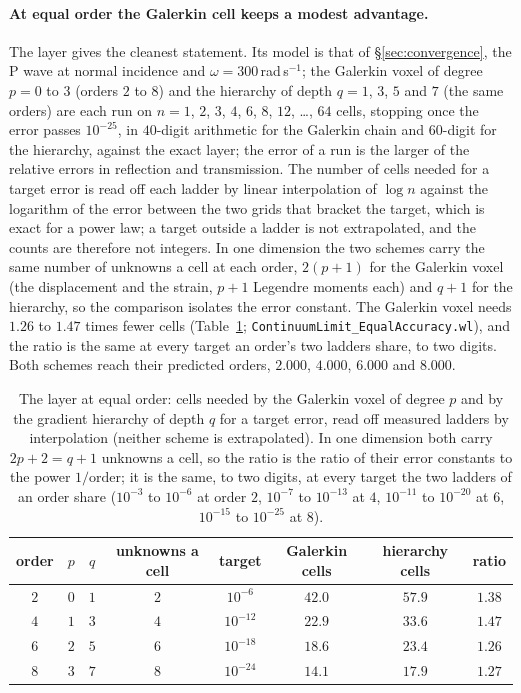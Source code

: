 \documentclass[11pt,a4paper]{article}
\newcommand{\nb}[1]{\texttt{#1}}
\begin{document}
\paragraph{At equal order the Galerkin cell keeps a modest advantage.} The layer gives the cleanest
statement. Its model is that of \S\ref{sec:convergence}, the P wave at normal incidence and
$\omega=300$\,rad\,s$^{-1}$; the Galerkin voxel of degree $p=0$ to $3$ (orders $2$ to $8$) and the
hierarchy of depth $q=1$, $3$, $5$ and $7$ (the same orders) are each run on $n=1$, $2$, $3$, $4$, $6$,
$8$, $12$, \dots, $64$ cells, stopping once the error passes $10^{-25}$, in $40$-digit arithmetic for the
Galerkin chain and $60$-digit for the hierarchy, against the exact layer; the error of a run is the larger
of the relative errors in reflection and transmission. The number of cells needed for a target error is
read off each ladder by linear interpolation of $\log n$ against the logarithm of the error between the
two grids that bracket the target, which is exact for a power law; a target outside a ladder is not
extrapolated, and the counts are therefore not integers. In one dimension the two schemes carry the same
number of unknowns a cell at each order, $2(p+1)$ for the Galerkin voxel (the displacement and the
strain, $p+1$ Legendre moments each) and $q+1$ for the hierarchy, so the comparison isolates the error
constant. The Galerkin voxel needs $1.26$ to $1.47$ times fewer cells (Table~\ref{tab:gainlayer};
\nb{ContinuumLimit\_EqualAccuracy.wl}), and the ratio is the same at every target an order's two
ladders share, to two digits. Both schemes reach their predicted orders, $2.000$, $4.000$, $6.000$ and
$8.000$.
\begin{table}[htbp]
\centering
\caption{The layer at equal order: cells needed by the Galerkin voxel of degree $p$ and by the gradient
hierarchy of depth $q$ for a target error, read off measured ladders by interpolation (neither scheme
is extrapolated). In one dimension both carry $2p+2=q+1$ unknowns a cell, so the ratio is the ratio of
their error constants to the power $1/\text{order}$; it is the same, to two digits, at every target the
two ladders of an order share ($10^{-3}$ to $10^{-6}$ at order $2$, $10^{-7}$ to $10^{-13}$ at $4$,
$10^{-11}$ to $10^{-20}$ at $6$, $10^{-15}$ to $10^{-25}$ at $8$).}\label{tab:gainlayer}
\begin{tabular}{@{}cccccccc@{}}
\toprule
order & $p$ & $q$ & unknowns a cell & target & Galerkin cells & hierarchy cells & ratio \\
\midrule
$2$ & $0$ & $1$ & $2$ & $10^{-6}$  & $42.0$ & $57.9$ & $1.38$ \\
$4$ & $1$ & $3$ & $4$ & $10^{-12}$ & $22.9$ & $33.6$ & $1.47$ \\
$6$ & $2$ & $5$ & $6$ & $10^{-18}$ & $18.6$ & $23.4$ & $1.26$ \\
$8$ & $3$ & $7$ & $8$ & $10^{-24}$ & $14.1$ & $17.9$ & $1.27$ \\
\bottomrule
\end{tabular}
\end{table}
\end{document}
